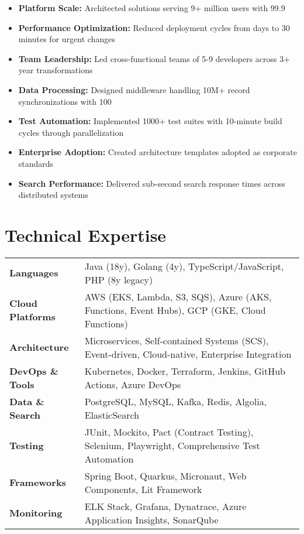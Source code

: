 \documentclass[11pt,a4paper]{article}
\begin{document}
\begin{itemize}[leftmargin=12pt,topsep=0pt,itemsep=0pt]
\item \textbf{Platform Scale:} Architected solutions serving 9+ million users with 99.9%
\item \textbf{Performance Optimization:} Reduced deployment cycles from days to 30 minutes for urgent changes
\item \textbf{Team Leadership:} Led cross-functional teams of 5-9 developers across 3+ year transformations
\item \textbf{Data Processing:} Designed middleware handling 10M+ record synchronizations with 100%
\item \textbf{Test Automation:} Implemented 1000+ test suites with 10-minute build cycles through parallelization
\item \textbf{Enterprise Adoption:} Created architecture templates adopted as corporate standards
\item \textbf{Search Performance:} Delivered sub-second search response times across distributed systems
\end{itemize}

\vspace{-4pt}

\section{Technical Expertise}

\begin{tabularx}{\textwidth}{L{3.5cm}X}
\textbf{Languages} & Java (18y), Golang (4y), TypeScript/JavaScript, PHP (8y legacy) \\
\textbf{Cloud Platforms} & AWS (EKS, Lambda, S3, SQS), Azure (AKS, Functions, Event Hubs), GCP (GKE, Cloud Functions) \\
\textbf{Architecture} & Microservices, Self-contained Systems (SCS), Event-driven, Cloud-native, Enterprise Integration \\
\textbf{DevOps \& Tools} & Kubernetes, Docker, Terraform, Jenkins, GitHub Actions, Azure DevOps \\
\textbf{Data \& Search} & PostgreSQL, MySQL, Kafka, Redis, Algolia, ElasticSearch \\
\textbf{Testing} & JUnit, Mockito, Pact (Contract Testing), Selenium, Playwright, Comprehensive Test Automation \\
\textbf{Frameworks} & Spring Boot, Quarkus, Micronaut, Web Components, Lit Framework \\
\textbf{Monitoring} & ELK Stack, Grafana, Dynatrace, Azure Application Insights, SonarQube \\
\end{tabularx}
\end{document}
